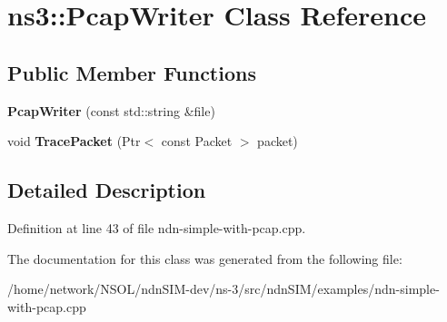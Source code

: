 \hypertarget{classns3_1_1PcapWriter}{}\section{ns3\+:\+:Pcap\+Writer Class Reference}
\label{classns3_1_1PcapWriter}
\subsection*{Public Member Functions}
\begin{DoxyCompactItemize}
\item 
{\bfseries Pcap\+Writer} (const std\+::string \&file)\hypertarget{classns3_1_1PcapWriter_ab45a9b0a028f52f3cee34c08a832a2b4}{}\label{classns3_1_1PcapWriter_ab45a9b0a028f52f3cee34c08a832a2b4}

\item 
void {\bfseries Trace\+Packet} (Ptr$<$ const Packet $>$ packet)\hypertarget{classns3_1_1PcapWriter_aad19760baa49e73bd9fbc145f014dab5}{}\label{classns3_1_1PcapWriter_aad19760baa49e73bd9fbc145f014dab5}

\end{DoxyCompactItemize}


\subsection{Detailed Description}


Definition at line 43 of file ndn-\/simple-\/with-\/pcap.\+cpp.



The documentation for this class was generated from the following file\+:\begin{DoxyCompactItemize}
\item 
/home/network/\+N\+S\+O\+L/ndn\+S\+I\+M-\/dev/ns-\/3/src/ndn\+S\+I\+M/examples/ndn-\/simple-\/with-\/pcap.\+cpp\end{DoxyCompactItemize}
